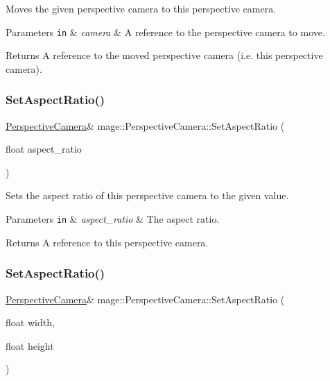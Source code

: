 Moves the given perspective camera to this perspective camera.


\begin{DoxyParams}[1]{Parameters}
\mbox{\tt in}  & {\em camera} & A reference to the perspective camera to move. \\
\hline
\end{DoxyParams}
\begin{DoxyReturn}{Returns}
A reference to the moved perspective camera (i.\+e. this perspective camera). 
\end{DoxyReturn}
\hypertarget{classmage_1_1_perspective_camera_afa5b9b8f6d1945fe63e9121359fb39bb}{}\label{classmage_1_1_perspective_camera_afa5b9b8f6d1945fe63e9121359fb39bb} 
\subsubsection{\texorpdfstring{Set\+Aspect\+Ratio()}{SetAspectRatio()}\hspace{0.1cm}{\footnotesize\ttfamily [1/2]}}
{\footnotesize\ttfamily \hyperlink{classmage_1_1_perspective_camera}{Perspective\+Camera}\& mage\+::\+Perspective\+Camera\+::\+Set\+Aspect\+Ratio (\begin{DoxyParamCaption}\item[{float}]{aspect\+\_\+ratio }\end{DoxyParamCaption})}

Sets the aspect ratio of this perspective camera to the given value.


\begin{DoxyParams}[1]{Parameters}
\mbox{\tt in}  & {\em aspect\+\_\+ratio} & The aspect ratio. \\
\hline
\end{DoxyParams}
\begin{DoxyReturn}{Returns}
A reference to this perspective camera. 
\end{DoxyReturn}
\hypertarget{classmage_1_1_perspective_camera_a8fa66b4025306709cf825b267c866b29}{}\label{classmage_1_1_perspective_camera_a8fa66b4025306709cf825b267c866b29} 
\subsubsection{\texorpdfstring{Set\+Aspect\+Ratio()}{SetAspectRatio()}\hspace{0.1cm}{\footnotesize\ttfamily [2/2]}}
{\footnotesize\ttfamily \hyperlink{classmage_1_1_perspective_camera}{Perspective\+Camera}\& mage\+::\+Perspective\+Camera\+::\+Set\+Aspect\+Ratio (\begin{DoxyParamCaption}\item[{float}]{width,  }\item[{float}]{height }\end{DoxyParamCaption})}

